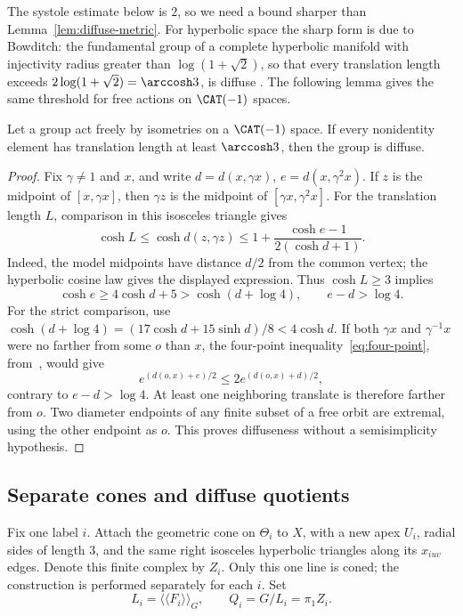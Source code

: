 The systole estimate below is \(2\), so we need a bound sharper than
Lemma~\ref{lem:diffuse-metric}. For hyperbolic space the sharp form
is due to Bowditch: the fundamental group of a complete hyperbolic
manifold with injectivity radius greater than \(\log(1+\sqrt2)\),
so that every translation length exceeds
\(2\log(1+\sqrt2)=\arccosh3\), is diffuse
\cite[Theorem~5.3 and Lemma~5.4]{Bowditch}. The following lemma
gives the same threshold for free actions on \(\CAT(-1)\) spaces.
\begin{lemma}\label{lem:midpoint-diffuse}
Let a group act freely by isometries on a \(\CAT(-1)\) space. If every
nonidentity element has translation length at least \(\arccosh3\),
then the group is diffuse.
\end{lemma}
\begin{proof}
Fix \(\gamma\ne1\) and \(x\), and write
\(d=d(x,\gamma x)\), \(e=d(x,\gamma^2x)\). If \(z\) is the midpoint
of \([x,\gamma x]\), then \(\gamma z\) is the midpoint of
\([\gamma x,\gamma^2x]\). For the translation length \(L\), comparison
in this isosceles triangle gives
\[
 \cosh L\le\cosh d(z,\gamma z)
 \le1+\frac{\cosh e-1}{2(\cosh d+1)}.
\]
Indeed, the model midpoints have distance \(d/2\) from the common
vertex; the hyperbolic cosine law gives the displayed expression.
Thus \(\cosh L\ge3\) implies
\[
 \cosh e\ge4\cosh d+5>\cosh(d+\log4),\qquad e-d>\log4.
\]
For the strict comparison, use
\(\cosh(d+\log4)=(17\cosh d+15\sinh d)/8<4\cosh d\).
If both \(\gamma x\) and \(\gamma^{-1}x\) were no farther from some
\(o\) than \(x\), the four-point inequality~\eqref{eq:four-point},
from~\cite[Definition~4.1 and Theorem~5.1]{NicaSpakula}, would give
\[
 e^{(d(o,x)+e)/2}\le2e^{(d(o,x)+d)/2},
\]
contrary to \(e-d>\log4\). At least one neighboring translate is
therefore farther from \(o\). Two diameter endpoints of any finite
subset of a free orbit are extremal, using the other endpoint as
\(o\). This proves diffuseness without a semisimplicity hypothesis.
\end{proof}

\subsection{Separate cones and diffuse quotients}

Fix one label \(i\). Attach the geometric cone on \(\Theta_i\) to
\(X\), with a new apex \(U_i\), radial sides of length \(3\), and
the same right isosceles hyperbolic triangles along its \(x_{iuv}\)
edges. Denote this finite complex by \(Z_i\). Only this one line is
coned; the construction is performed separately for each \(i\).
Set
\[
 L_i=\langle\!\langle F_i\rangle\!\rangle_G,\qquad
 Q_i=G/L_i=\pi_1Z_i.
\]

